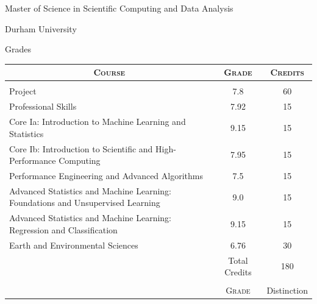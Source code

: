 \documentclass[a4paper,10pt]{article} %
\begin{document}
\newpage
\par{\centering\LARGE \hypertarget{grdsmsc}{Master of Science in Scientific Computing and Data Analysis}\par}\par{\centering\Large Durham University\par}\large{\centering Grades\par}\small
\bigskip
\bigskip
\bigskip
\begin{center}
\begin{tabular}{lcc}
\multicolumn{1}{c}{\textsc{Course}} & \textsc{Grade}&\textsc{Credits}\\ \hline \\
Project & 7.8 & 60 \\
Professional Skills & 7.92 & 15\\
Core Ia: Introduction to Machine Learning and Statistics & 9.15 & 15 \\
Core Ib: Introduction to Scientific and High-Performance Computing & 7.95 & 15 \\
Performance Engineering and Advanced Algorithms & 7.5 & 15 \\
Advanced Statistics and Machine Learning: Foundations and Unsupervised Learning & 9.0 & 15 \\
Advanced Statistics and Machine Learning: Regression and Classification & 9.15 & 15 \\
Earth and Environmental Sciences & 6.76 & 30 \\
& Total Credits & 180 \\ \\
&\textsc{Grade}& Distinction
\end{tabular}
\end{center}
\vspace{5cm}
\end{document}

